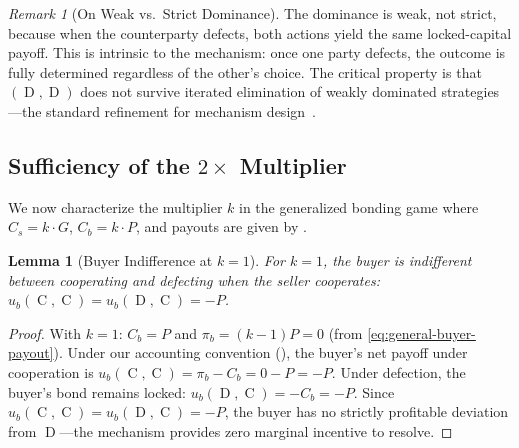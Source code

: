 \documentclass[11pt,a4paper]{article}
\newtheorem{lemma}[theorem]{Lemma}
\theoremstyle{definition}
\theoremstyle{remark}
\newtheorem{remark}[theorem]{Remark}
\newcommand{\pay}{P}           %
\newcommand{\cumval}{G}        %
\newcommand{\sbond}{C_s}       %
\newcommand{\bbond}{C_b}       %
\newcommand{\bpay}{\pi_b}      %
\newcommand{\ub}{u_b}          %
\DeclareMathOperator{\Coop}{C}
\DeclareMathOperator{\Def}{D}
\begin{document}
\begin{remark}[On Weak vs.\ Strict Dominance]
\label{rem:dominance-note}
The dominance is weak, not strict, because when the counterparty
defects, both actions yield the same locked-capital payoff. This is
intrinsic to the mechanism: once one party defects, the outcome is
fully determined regardless of the other's choice. The critical
property is that $(\Def, \Def)$ does not survive iterated elimination
of weakly dominated strategies---the standard refinement for
mechanism design~\citep{myerson1979}.
\end{remark}

\subsection{Sufficiency of the $2\times$ Multiplier}

We now characterize the multiplier $k$ in the generalized bonding game
where $\sbond = k \cdot \cumval$, $\bbond = k \cdot \pay$, and
payouts are given by .

\begin{lemma}[Buyer Indifference at $k = 1$]
\label{lem:k1-buyer}
For $k = 1$, the buyer is indifferent between cooperating and defecting
when the seller cooperates:
$\ub(\Coop, \Coop) = \ub(\Def, \Coop) = -\pay$.
\end{lemma}
\begin{proof}
With $k = 1$: $\bbond = \pay$ and $\bpay = (k-1)\pay = 0$ (from
\eqref{eq:general-buyer-payout}). Under our accounting convention
(), the buyer's net payoff under cooperation
is $\ub(\Coop, \Coop) = \bpay - \bbond = 0 - \pay = -\pay$. Under
defection, the buyer's bond remains locked:
$\ub(\Def, \Coop) = -\bbond = -\pay$. Since
$\ub(\Coop, \Coop) = \ub(\Def, \Coop) = -\pay$, the buyer has no
strictly profitable deviation from $\Def$---the mechanism provides
zero marginal incentive to resolve.
\end{proof}
\end{document}
